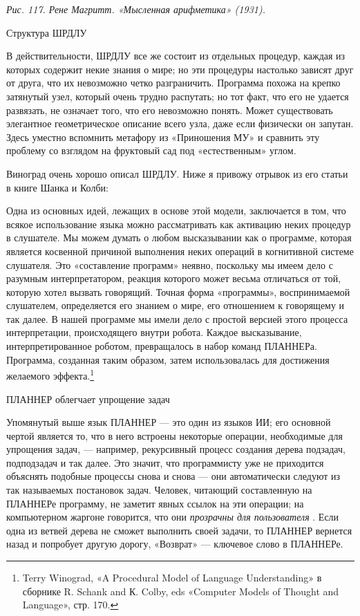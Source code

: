\documentclass[../main.tex]{subfiles}
\begin{document}
\emph{Рис. 117. Рене Магритт. «Мысленная арифметика» (1931).}

Структура ШРДЛУ

В действительности, ШРДЛУ все же состоит из отдельных процедур, каждая из которых содержит некие знания о мире; но эти процедуры настолько зависят друг от друга, что их невозможно четко разграничить. Программа похожа на крепко затянутый узел, который очень трудно распутать; но тот факт, что его не удается развязать, не означает того, что его невозможно понять. Может существовать элегантное геометрическое описание всего узла, даже если физически он запутан. Здесь уместно вспомнить метафору из «Приношения МУ» и сравнить эту проблему со взглядом на фруктовый сад под «естественным» углом.

Виноград очень хорошо описал ШРДЛУ. Ниже я привожу отрывок из его статьи в книге Шанка и Колби:

Одна из основных идей, лежащих в основе этой модели, заключается в том, что всякое использование языка можно рассматривать как активацию неких процедур в слушателе. Мы можем думать о любом высказывании как о программе, которая является косвенной причиной выполнения неких операций в когнитивной системе слушателя. Это «составление программ» неявно, поскольку мы имеем дело с разумным интерпретатором, реакция которого может весьма отличаться от той, которую хотел вызвать говорящий. Точная форма «программы», воспринимаемой слушателем, определяется его знанием о мире, его отношением к говорящему и так далее. В нашей программе мы имели дело с простой версией этого процесса интерпретации, происходящего внутри робота. Каждое высказывание, интерпретированное роботом, превращалось в набор команд ПЛАННЕРа. Программа, созданная таким образом, затем использовалась для достижения желаемого эффекта.\footnote{Terry Winograd, «A Procedural Model of Language Understanding» в сборнике R. Schank and К. Colby, eds «Computer Models of Thought and Language», стр. 170.}

ПЛАННЕР облегчает упрощение задач

Упомянутый выше язык ПЛАННЕР --- это один из языков ИИ; его основной чертой является то, что в него встроены некоторые операции, необходимые для упрощения задач, --- например, рекурсивный процесс создания дерева подзадач, подподзадач и так далее. Это значит, что программисту уже не приходится объяснять подобные процессы снова и снова --- они автоматически следуют из так называемых постановок задач. Человек, читающий составленную на ПЛАННЕРе программу, не заметит явных ссылок на эти операции; на компьютерном жаргоне говорится, что они \emph{прозрачны для пользователя} . Если одна из ветвей дерева не сможет выполнить своей задачи, то ПЛАННЕР вернется назад и попробует другую дорогу, «Возврат» --- ключевое слово в ПЛАННЕРе.
\end{document}
